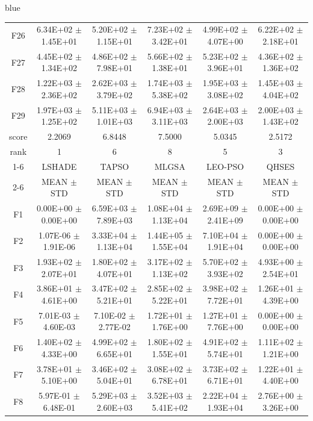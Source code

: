 \documentclass[journal, onecolumn]{IEEEtran}
\begin{document}
\begin{color}{blue}
\begin{table}[htbp!]
\begin{tabular}{c|ccccc}
		F26	 &	6.34E+02	$\pm$	1.45E+01	 &	5.20E+02	$\pm$	1.15E+01		 &	7.23E+02	$\pm$	3.42E+01		 &	4.99E+02	$\pm$	4.07E+00		 &	6.22E+02	$\pm$	2.18E+01	\\	
		F27	 &	4.45E+02	$\pm$	1.34E+02	 &	4.86E+02	$\pm$	7.98E+01		 &	5.66E+02	$\pm$	1.38E+01		 &	5.23E+02	$\pm$	3.96E+01		 &	4.36E+02	$\pm$	1.36E+02	\\	
		F28	 &	1.22E+03	$\pm$	2.36E+02	 &	2.62E+03	$\pm$	3.79E+02		 &	1.74E+03	$\pm$	5.38E+02		 &	1.95E+03	$\pm$	3.08E+02		 &	1.45E+03	$\pm$	4.04E+02	\\	
		F29	 &	1.97E+03	$\pm$	1.25E+02	 &	5.11E+03	$\pm$	1.01E+03		 &	6.94E+03	$\pm$	3.11E+03		 &	2.64E+03	$\pm$	2.00E+03		 &	2.00E+03	$\pm$	1.43E+02	\\	\hline
		score		& 2.2069 & 6.8448 & 7.5000 & 5.0345 & 2.5172											\\												
		rank	 	& 1 & 6 & 8 & 5 & 3											\\	\cline{1-6}											
		&	LSHADE				 &	TAPSO				 &	MLGSA				 &	LEO-PSO				 &	QHSES			\\\cline{2-6}	
		&	MEAN	$\pm$	STD		 &	MEAN	$\pm$	STD		 &	MEAN	$\pm$	STD		 &	MEAN	$\pm$	STD		 &	MEAN	$\pm$	STD	\\\hline
		F1	 &	0.00E+00	$\pm$	0.00E+00		 &	6.59E+03	$\pm$	7.89E+03		 &	1.08E+04	$\pm$	1.13E+04		 &	2.69E+09	$\pm$	2.41E+09		 &	0.00E+00	$\pm$	0.00E+00	\\
		F2	 &	1.07E-06	$\pm$	1.91E-06		 &	3.33E+04	$\pm$	1.13E+04		 &	1.44E+05	$\pm$	1.55E+04		 &	7.10E+04	$\pm$	1.91E+04		 &	0.00E+00	$\pm$	0.00E+00	\\
		F3	 &	1.93E+02	$\pm$	2.07E+01		 &	1.80E+02	$\pm$	4.07E+01		 &	3.17E+02	$\pm$	1.13E+02		 &	5.70E+02	$\pm$	3.93E+02		 &	4.93E+00	$\pm$	2.54E+01	\\
		F4	 &	3.86E+01	$\pm$	4.61E+00		 &	3.47E+02	$\pm$	5.21E+01		 &	2.85E+02	$\pm$	5.22E+01		 &	3.98E+02	$\pm$	7.72E+01		 &	1.26E+01	$\pm$	4.39E+00	\\
		F5	 &	7.01E-03	$\pm$	4.60E-03		 &	7.10E-02	$\pm$	2.77E-02		 &	1.72E+01	$\pm$	1.76E+00		 &	1.27E+01	$\pm$	7.76E+00		 &	0.00E+00	$\pm$	0.00E+00	\\
		F6	 &	1.40E+02	$\pm$	4.33E+00		 &	4.99E+02	$\pm$	6.65E+01		 &	1.80E+02	$\pm$	1.55E+01		 &	4.91E+02	$\pm$	5.74E+01		 &	1.11E+02	$\pm$	1.21E+00	\\
		F7	 &	3.78E+01	$\pm$	5.10E+00		 &	3.46E+02	$\pm$	5.04E+01		 &	3.08E+02	$\pm$	6.78E+01		 &	3.73E+02	$\pm$	6.71E+01		 &	1.22E+01	$\pm$	4.40E+00	\\
		F8	 &	5.97E-01	$\pm$	6.48E-01		 &	5.29E+03	$\pm$	2.60E+03		 &	3.52E+03	$\pm$	5.41E+02		 &	2.22E+04	$\pm$	1.93E+04		 &	2.76E+00	$\pm$	3.26E+00	\\

\end{tabular}
\end{table}
\end{color}
\end{document}
